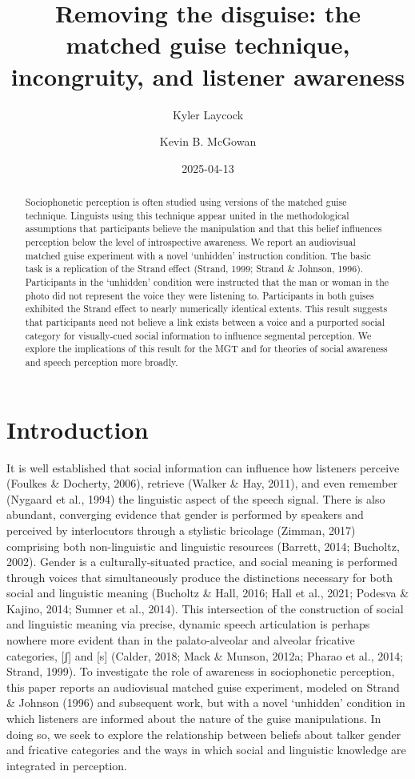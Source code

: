 \documentclass[
  letterpaper,
  DIV=11,
  numbers=noendperiod]{scrartcl}
\title{Removing the disguise: the matched guise technique, incongruity,
and listener awareness}
\author{Kyler Laycock \and Kevin B. McGowan}
\date{2025-04-13}
\begin{document}
\maketitle
\begin{abstract}
Sociophonetic perception is often studied using versions of the matched
guise technique. Linguists using this technique appear united in the
methodological assumptions that participants believe the manipulation
and that this belief influences perception below the level of
introspective awareness. We report an audiovisual matched guise
experiment with a novel `unhidden' instruction condition. The basic task
is a replication of the Strand effect (Strand, 1999; Strand \& Johnson,
1996). Participants in the `unhidden' condition were instructed that the
man or woman in the photo did not represent the voice they were
listening to. Participants in both guises exhibited the Strand effect to
nearly numerically identical extents. This result suggests that
participants need not believe a link exists between a voice and a
purported social category for visually-cued social information to
influence segmental perception. We explore the implications of this
result for the MGT and for theories of social awareness and speech
perception more broadly.
\end{abstract}


\section{Introduction}\label{sec-intro}

It is well established that social information can influence how
listeners perceive (Foulkes \& Docherty, 2006), retrieve (Walker \& Hay,
2011), and even remember (Nygaard et al., 1994) the linguistic aspect of
the speech signal. There is also abundant, converging evidence that
gender is performed by speakers and perceived by interlocutors through a
stylistic bricolage (Zimman, 2017) comprising both non-linguistic and
linguistic resources (Barrett, 2014; Bucholtz, 2002). Gender is a
culturally-situated practice, and social meaning is performed through
voices that simultaneously produce the distinctions necessary for both
social and linguistic meaning (Bucholtz \& Hall, 2016; Hall et al.,
2021; Podesva \& Kajino, 2014; Sumner et al., 2014). This intersection
of the construction of social and linguistic meaning via precise,
dynamic speech articulation is perhaps nowhere more evident than in the
palato-alveolar and alveolar fricative categories, {[}ʃ{]} and {[}s{]}
(Calder, 2018; Mack \& Munson, 2012a; Pharao et al., 2014; Strand,
1999). To investigate the role of awareness in sociophonetic perception,
this paper reports an audiovisual matched guise experiment, modeled on
Strand \& Johnson (1996) and subsequent work, but with a novel
`unhidden' condition in which listeners are informed about the nature of
the guise manipulations. In doing so, we seek to explore the
relationship between beliefs about talker gender and fricative
categories and the ways in which social and linguistic knowledge are
integrated in perception.
\end{document}

